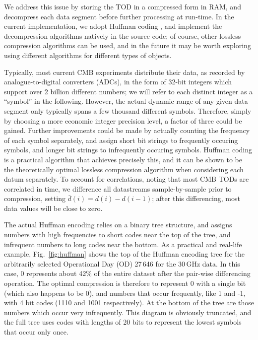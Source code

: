 \documentclass[twocolumn]{aa}
\begin{document}
We address this issue by storing the TOD in a compressed form in RAM,
and decompress each data segment before further processing at
run-time. In the current implementation, we adopt Huffman coding
\citep{Huffman}, and implement the decompression algorithms natively
in the source code; of course, other lossless compression algorithms
can be used, and in the future it may be worth exploring using
different algorithms for different types of objects.

Typically, most current CMB experiments distribute their data, as
recorded by analogue-to-digital converters (ADCs), in the form of
32-bit integers which support over 2 billion different numbers; we
will refer to each distinct integer as a ``symbol'' in the
following. However, the actual dynamic range of any given data segment
only typically spans a few thousand different symbols. Therefore,
simply by choosing a more economic integer precision level, a factor
of three could be gained. Further improvements could be made by
actually counting the frequency of each symbol separately, and assign
short bit strings to frequently occuring symbols, and longer bit
strings to infrequently occuring symbols. Huffman coding is a
practical algorithm that achieves precisely this, and it can be shown
to be the theoretically optimal lossless compression algorithm when
considering each datum separately. To account for correlations, noting
that most CMB TODs are correlated in time, we difference all
datastreams sample-by-sample prior to compression, setting $\bar{d}(i)
= d(i)-d(i-1)$; after this differencing, most data values will be
close to zero.


The actual Huffman encoding relies on a binary tree structure, and
assigns numbers with high frequencies to short codes near the top of
the tree, and infrequent numbers to long codes near the bottom.  As a
practical and real-life example, Fig.~\ref{fig:huffman} shows the top
of the Huffman encoding tree for the arbitrarily selected Operational
Day (OD) 27\,646 for the 30\,GHz data. In this case, 0 represents
about 42\% of the entire dataset after the pair-wise differencing
operation. The optimal compression is therefore to represent 0 with a
single bit (which also happens to be 0), and numbers that occur
frequently, like 1 and -1, with 4 bit codes (1110 and 1001
respectively). At the bottom of the tree are those numbers which occur
very infrequently. This diagram is obviously truncated, and the full
tree uses codes with lengths of 20 bits to represent the lowest
symbols that occur only once.
\end{document}
